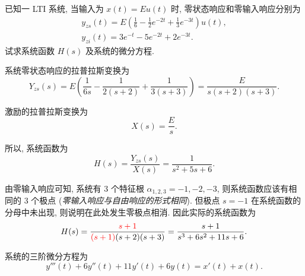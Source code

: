 \begin{exampleprob}
    已知一 LTI 系统, 当输入为 $x(t)=Eu(t)$ 时, 零状态响应和零输入响应分别为
    \begin{gather*}
        y_{zs}(t)=E\left(\frac{1}{6}-\frac{1}{2}e^{-2t}+\frac{1}{3}e^{-3t}\right)u(t), \\
        y_{zi}(t)=3e^{-t}-5e^{-2t}+2e^{-3t}.
    \end{gather*}
    试求系统函数 $H(s)$ 及系统的微分方程.

    \begin{solution}
        系统零状态响应的拉普拉斯变换为
        \begin{equation*}
            Y_{zs}(s)=E\left(\frac{1}{6s}-\frac{1}{2(s+2)}+\frac{1}{3(s+3)}\right)=\frac{E}{s(s+2)(s+3)}.
        \end{equation*}

        激励的拉普拉斯变换为
        \begin{equation*}
            X(s)=\frac{E}{s}.
        \end{equation*}

        所以, 系统函数为
        \begin{equation*}
            H(s)=\frac{Y_{zs}(s)}{X(s)}=\frac{1}{s^2+5s+6}.
        \end{equation*}

        由零输入响应可知, 系统有 3 个特征根 $\alpha_{1,2,3}=-1,-2,-3$, 则系统函数应该有相同的 3 个极点 (\textit{零输入响应与自由响应的形式相同}). 但极点 $s=-1$ 在系统函数的分母中未出现, 则说明在此处发生零极点相消. 因此实际的系统函数为
        \begin{equation*}
            H(s)=\frac{\color{red} s+1}{{\color{red} (s+1)}(s+2)(s+3)}=\frac{s+1}{s^3+6s^2+11s+6}.
        \end{equation*}

        \question[系统微分方程与系统函数的关系]
        系统的三阶微分方程为
        \begin{equation*}
            y'''(t)+6y''(t)+11y'(t)+6y(t)=x'(t)+x(t).
        \end{equation*}
    \end{solution}
\end{exampleprob}

